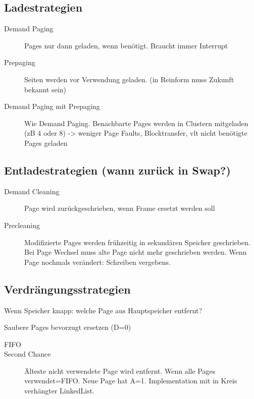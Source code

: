 \begin{multicols*}{4}
\subsection{Ladestrategien}
\begin{description}
    \item[Demand Paging] Pages nur dann geladen, wenn benötigt. Braucht immer Interrupt
    \item[Prepaging] Seiten werden vor Verwendung geladen. (in Reinform muss Zukunft bekannt sein)
    \item[Demand Paging mit Prepaging] Wie Demand Paging. Benachbarte Pages werden in Clustern mitgeladen (zB 4 oder 8)
    -> weniger Page Faults, Blocktransfer, vlt nicht benötigte Pages geladen
\end{description}

\subsection{Entladestrategien (wann zurück in Swap?)}
\begin{description}
    \item[Demand Cleaning] Page wird zurückgeschrieben, wenn Frame ersetzt werden soll
    \item[Precleaning] Modifizierte Pages werden frühzeitig in sekundären Speicher geschrieben.
    Bei Page Wechsel muss alte Page nicht mehr geschrieben werden. Wenn Page nochmals verändert: Schreiben vergebens.
\end{description}

\subsection{Verdrängungsstrategien}
Wenn Speicher knapp: welche Page aus Hauptspeicher entfernt?

Saubere Pages bevorzugt ersetzen (D=0)

\begin{description}
    \item[FIFO]
    \item[Second Chance] Älteste nicht verwendete Page wird entfernt. Wenn alle Pages verwendet=FIFO. Neue Page hat A=1. Implementation mit in Kreis verhängter LinkedList.
\end{description}

\end{multicols*}

